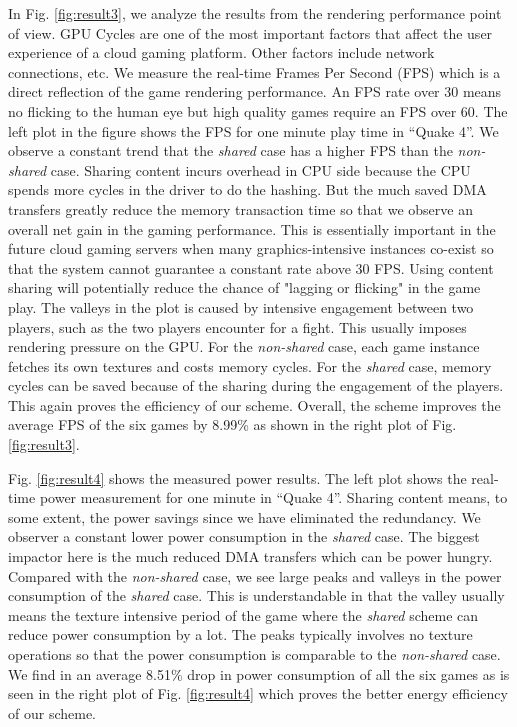 \documentclass[pageno]{jpaper}
\begin{document}
In Fig. \ref{fig:result3}, we analyze the results from the rendering performance point of view. GPU Cycles are one of the most important factors that affect the user experience of a cloud gaming platform. Other factors include network connections, etc. We measure the real-time Frames Per Second (FPS) which is a direct reflection of the game rendering performance. An FPS rate over 30 means no flicking to the human eye but high quality games require an FPS over 60. The left plot in the figure shows the FPS for one minute play time in ``Quake 4''. We observe a constant trend that the \emph {shared} case has a higher FPS than the \emph{non-shared} case. Sharing content incurs overhead in CPU side because the CPU spends more cycles in the driver to do the hashing. But the much saved DMA transfers greatly reduce the memory transaction time so that we observe an overall net gain in the gaming performance. This is essentially important in the future cloud gaming servers when many graphics-intensive instances co-exist so that the system cannot guarantee a constant rate above 30 FPS. Using content sharing will potentially reduce the chance of "lagging or flicking" in the game play. The valleys in the plot is caused by intensive engagement between two players, such as the two players encounter for a fight. This usually imposes rendering pressure on the GPU. For the \emph{non-shared} case, each game instance fetches its own textures and costs memory cycles. For the \emph {shared} case, memory cycles can be saved because of the sharing during the engagement of the players. This again proves the efficiency of our scheme. Overall, the scheme improves the average FPS of the six games by 8.99\% as shown in the right plot of Fig. \ref{fig:result3}.


  Fig. \ref{fig:result4} shows the measured power results. The left plot shows the real-time power measurement for one minute in ``Quake 4''. Sharing content means, to some extent, the power savings since we have eliminated the redundancy. We observer a constant lower power consumption in the \emph {shared} case. The biggest impactor here is the much reduced DMA transfers which can be power hungry. Compared with the \emph {non-shared} case, we see large peaks and valleys in the power consumption of the \emph {shared} case. This is understandable in that the valley usually means the texture intensive period of the game where the \emph {shared} scheme can reduce power consumption by a lot. The peaks typically involves no texture operations so that the power consumption is comparable to the \emph {non-shared} case. We find in an average 8.51\% drop in power consumption of all the six games as is seen in the right plot of Fig. \ref{fig:result4} which proves the better energy efficiency of our scheme.
\end{document}
